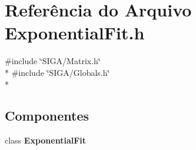 \section{Referência do Arquivo Exponential\+Fit.\+h}
\label{_exponential_fit_8h}
{\ttfamily \#include \char`\"{}S\+I\+G\+A/\+Matrix.\+h\char`\"{}}\\*
{\ttfamily \#include \char`\"{}S\+I\+G\+A/\+Globals.\+h\char`\"{}}\\*
\subsection*{Componentes}
\begin{DoxyCompactItemize}
\item 
class {\bf Exponential\+Fit}
\end{DoxyCompactItemize}
